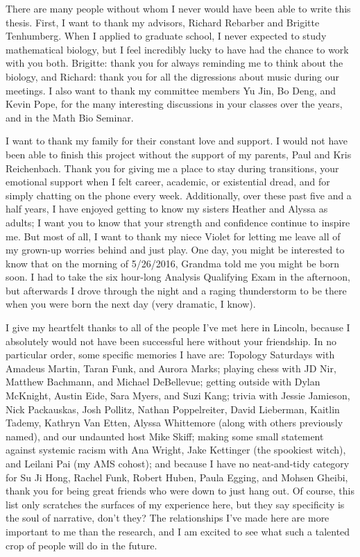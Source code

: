 \documentclass[final]{nuthesis}
\theoremstyle{definition}
\numberwithin{theorem}{section}
\numberwithin{lemma}{section}
\numberwithin{corollary}{section}
\numberwithin{definition}{section}
\numberwithin{equation}{section}
\begin{document}
\begin{acknowledgments}
	There are many people without whom I never would have been able to write this thesis. First, I want to thank my advisors, Richard Rebarber and Brigitte Tenhumberg. When I applied to graduate school, I never expected to study mathematical biology, but I feel incredibly lucky to have had the chance to work with you both. Brigitte: thank you for always reminding me to think about the biology, and Richard: thank you for all the digressions about music during our meetings. I also want to thank my committee members Yu Jin, Bo Deng, and Kevin Pope, for the many interesting discussions in your classes over the years, and in the Math Bio Seminar.
	
	I want to thank my family for their constant love and support. I would not have been able to finish this project without the support of my parents, Paul and Kris Reichenbach. Thank you for giving me a place to stay during transitions, your emotional support when I felt career, academic, or existential dread, and for simply chatting on the phone every week. Additionally, over these past five and a half years, I have enjoyed getting to know my sisters Heather and Alyssa as adults; I want you to know that your strength and confidence continue to inspire me. But most of all, I want to thank my niece Violet for letting me leave all of my grown-up worries behind and just play. One day, you might be interested to know that on the morning of 5/26/2016, Grandma told me you might be born soon. I had to take the six hour-long Analysis Qualifying Exam in the afternoon, but afterwards I drove through the night and a raging thunderstorm to be there when you were born the next day (very dramatic, I know).
	
	I give my heartfelt thanks to all of the people I've met here in Lincoln, because I absolutely would not have been successful here without your friendship. In no particular order, some specific memories I have are: Topology Saturdays with Amadeus Martin, Taran Funk, and Aurora Marks; playing chess with JD Nir, Matthew Bachmann, and Michael DeBellevue; getting outside with Dylan McKnight, Austin Eide, Sara Myers, and Suzi Kang; trivia with Jessie Jamieson, Nick Packauskas, Josh Pollitz, Nathan Poppelreiter, David Lieberman, Kaitlin Tademy, Kathryn Van Etten, Alyssa Whittemore (along with others previously named), and our undaunted host Mike Skiff; making some small statement against systemic racism with Ana Wright, Jake Kettinger (the spookiest witch), and Leilani Pai (my AMS cohost); and because I have no neat-and-tidy category for Su Ji Hong, Rachel Funk, Robert Huben, Paula Egging, and Mohsen Gheibi, thank you for being great friends who were down to just hang out. Of course, this list only scratches the surfaces of my experience here, but they say specificity is the soul of narrative, don't they? The relationships I've made here are more important to me than the research, and I am excited to see what such a talented crop of people will do in the future.
	

\end{acknowledgments}
\end{document}
